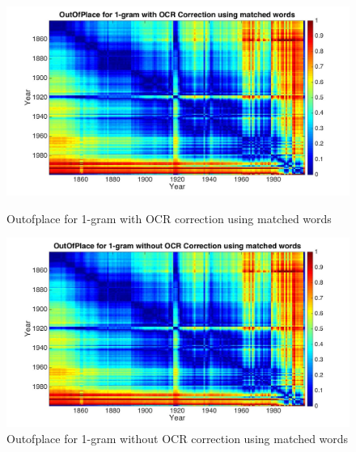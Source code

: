 \begin{figure}[H]
    \begin{minipage}[b]{0.48\linewidth}
        \includegraphics[scale=0.15]{Pictures/outofplace/outofplace_1-gram_correctedOCR_matched_words.jpg}
        \caption{Outofplace for 1-gram with OCR correction using matched words}
        \label{outofplace_1_match_correct}
    \end{minipage}\hfill
    \begin{minipage}[b]{0.5\linewidth}
        \includegraphics[scale=0.15]{Pictures/outofplace/outofplace_1-gram_noncorrectedOCR_matched_words.jpg}
        \caption{Outofplace for 1-gram without OCR correction using matched words}
        \label{outofplace_1_match_noncorrect}
    \end{minipage}\hfill
\end{figure}


